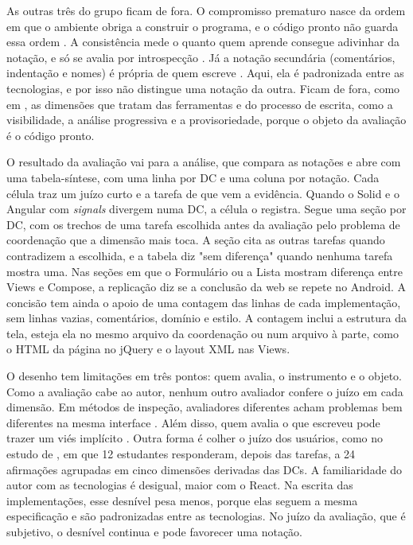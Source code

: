 As outras três do grupo ficam de fora.
O compromisso prematuro nasce da ordem em que o ambiente obriga a
construir o programa, e o código pronto não guarda essa ordem
\cite{green1996d}.
A consistência mede o quanto quem aprende consegue adivinhar da notação,
e só se avalia por introspecção \cite{green1996d}.
Já a notação secundária (comentários, indentação e nomes) é própria de
quem escreve \cite{green1996d}.
Aqui, ela é padronizada entre as tecnologias, e por isso não distingue
uma notação da outra.
Ficam de fora, como em \textcite[p. 15]{kiss2014}, as dimensões que
tratam das ferramentas e do processo de escrita, como a visibilidade, a
análise progressiva e a provisoriedade, porque o objeto da avaliação é o
código pronto.

O resultado da avaliação vai para a análise, que compara as notações e
abre com uma tabela-síntese, com uma linha por DC e uma coluna por notação.
Cada célula traz um juízo curto e a tarefa de que vem a evidência.
Quando o Solid e o Angular com \emph{signals} divergem numa DC, a célula o
registra.
Segue uma seção por DC, com os trechos de uma tarefa escolhida antes da avaliação pelo problema de coordenação que a dimensão mais toca.
A seção cita as outras tarefas quando contradizem a escolhida, e a tabela
diz "sem diferença" quando nenhuma tarefa mostra uma.
Nas seções em que o Formulário ou a Lista mostram diferença entre Views e
Compose, a replicação diz se a conclusão da web se repete no Android.
A concisão tem ainda o apoio de uma contagem das linhas de cada
implementação, sem linhas vazias, comentários, domínio e estilo.
A contagem inclui a estrutura da tela, esteja ela no mesmo arquivo da
coordenação ou num arquivo à parte, como o HTML da página no jQuery e o
layout XML nas Views.

O desenho tem limitações em três pontos: quem avalia, o instrumento e o
objeto.
Como a avaliação cabe ao autor, nenhum outro avaliador confere o juízo em
cada dimensão.
Em métodos de inspeção, avaliadores diferentes acham problemas bem
diferentes na mesma interface \cite{hertzum2003}.
Além disso, quem avalia o que escreveu pode trazer um viés implícito
\cite{ledo2018}.
Outra forma é colher o juízo dos usuários, como no estudo de
\textcite[p. 1512-1513 e 1519]{zimmerle2025}, em que 12 estudantes
responderam, depois das tarefas, a 24 afirmações agrupadas em cinco
dimensões derivadas das DCs.
A familiaridade do autor com as tecnologias é desigual, maior com o React.
Na escrita das implementações, esse desnível pesa menos, porque elas seguem
a mesma especificação e são padronizadas entre as tecnologias.
No juízo da avaliação, que é subjetivo, o desnível continua e pode favorecer
uma notação.

